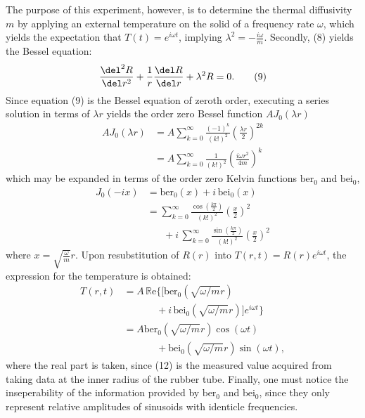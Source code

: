 \documentclass[11pt]{article}
\begin{document}
\begin{multicols}{2}
    The purpose of this experiment, however, is to determine the thermal diffusivity $m$ by applying an external temperature on the solid of a frequency rate $\omega$, which yields the expectation that $T(t) = e^{i\omega t}$, implying $\lambda^2 = -\frac{i\omega}{m}$. Secondly, (8) yields the Bessel equation:
    \[
        \frac{\del^2 R}{\del r^2} + \frac{1}{r}\frac{\del R}{\del r} + \lambda^2 R = 0. \tag{9}
    \]
    Since equation (9) is the Bessel equation of zeroth order, executing a series solution in terms of $\lambda r$ yields the order zero Bessel function $A J_0(\lambda r)$
    \begin{align*}
        AJ_0(\lambda r) &= A\sum_{k=0}^{\infty}\frac{(-1)^k}{(k!)^2}\left(\frac{\lambda r}{2}\right)^{2k} \tag{10.1}  \\
        &=A\sum_{k=0}^{\infty}\frac{1}{(k!)^2}\left(\frac{i\omega r^2}{4m}\right)^{k} \tag{10.2}
    \end{align*}
    \nd which may be expanded in terms of the order zero Kelvin functions $\text{ber}_0$ and $\text{bei}_0$, 
    \begin{align*}
        J_0(-ix) &= \text{ber}_0(x) + i\, \text{bei}_0(x) \tag{11.1}\\ 
        &= \sum_{k=0}^{\infty} \frac{\cos\left(\frac{k\pi}{2}\right)}{(k!)^2}\left(\frac{x}{2}\right)^2\\
        &\hspace{20pt}+ i\, \sum_{k=0}^{\infty} \frac{\sin\left(\frac{k\pi}{2}\right)}{(k!)^2}\left(\frac{x}{2}\right)^2\tag{11.2} 
    \end{align*}
    \nd where $x = \sqrt{\frac{\omega}{m}}r$. Upon resubstitution of $R(r)$ into $T(r,t) = R(r)e^{i\omega t}$, the expression for the temperature is obtained: 
   \begin{align*}
        T(r, t) &= A\, \mathbb{R}\text{e}\bigg\{\bigg[\text{ber}_0(\sqrt{\omega/m}r)\\
        &\hspace{40pt} + i\, \text{bei}_0(\sqrt{\omega/m}r)\bigg]e^{i\omega t}\bigg\} \\
        &=   A\text{ber}_0(\sqrt{\omega/m}r)\cos(\omega t) \\
        & \hspace{40pt} +  \text{bei}_0(\sqrt{\omega/m}r)\sin(\omega t),  \tag{12}
    \end{align*} 
    \nd where the real part is taken, since (12) is the measured value acquired from taking data at the inner radius of the rubber tube. Finally, one must notice the inseperability of the information provided by $\text{ber}_0$ and $\text{bei}_0$, since they only represent relative amplitudes of sinusoids with identicle frequencies.






\end{multicols}
\end{document}
